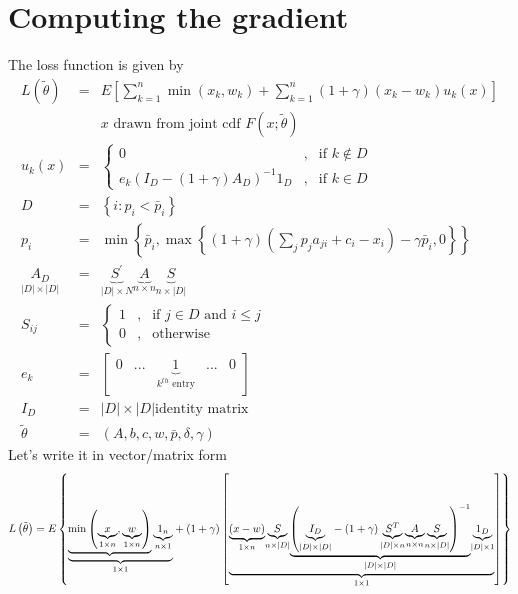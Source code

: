 \documentclass{article}
\begin{document}
\section{Computing the gradient}

The loss function is given by 
\begin{eqnarray*}
L\left( \tilde{\theta}\right)  &=&E\left[ \sum_{k=1}^{n}\min \left(
x_{k},w_{k}\right) +\sum_{k=1}^{n}\left( 1+\gamma \right) \left(
x_{k}-w_{k}\right) u_{k}\left( x\right) \right]  \\
&&x\text{ drawn from joint cdf }F\left( x;\tilde{\theta}\right)  \\
u_{k}\left( x\right)  &=&\left\{ 
\begin{array}{ccc}
0 & , & \text{if }k\notin D \\ 
e_{k}\left( I_{D}-\left( 1+\gamma \right) A_{D}\right) ^{-1}1_{D} & , & 
\text{if }k\in D%
\end{array}%
\right.  \\
D &=&\left\{ i:p_{i}<\bar{p}_{i}\right\}  \\
p_{i} &=&\min \left\{ \bar{p}_{i},\max \left\{ \left( 1+\gamma \right)
\left( \sum_{j}p_{j}a_{ji}+c_{i}-x_{i}\right) -\gamma \bar{p}_{i},0\right\}
\right\}  \\
\underset{\left\vert D\right\vert \times \left\vert D\right\vert }{A_{D}} &=&%
\underset{\left\vert D\right\vert \times N}{\underbrace{S^{\prime }}}%
\underset{n\times n}{\underbrace{A}}\underset{n\times \left\vert
D\right\vert }{\underbrace{S}} \\
S_{ij} &=&\left\{ 
\begin{array}{ccc}
1 & , & \text{if }j\in D\text{ and }i\leq j \\ 
0 & , & \text{otherwise}%
\end{array}%
\right.  \\
e_{k} &=&\left[ 
\begin{array}{ccccc}
0 & ... & \underset{k^{th}\text{ entry}}{\underbrace{1}} & ... & 0%
\end{array}%
\right]  \\
I_{D} &=&\left\vert D\right\vert \times \left\vert D\right\vert \text{
identity matrix} \\
\tilde{\theta} &=&\left( A,b,c,w,\bar{p},\delta ,\gamma \right) 
\end{eqnarray*}%
Let's write it in vector/matrix form%
\[
L\left( \tilde{\theta}\right) =E\left\{ \underset{1\times 1}{\underbrace{%
\underbrace{\min \left( \underset{1\times n}{\underbrace{x}},\underset{%
1\times n}{\underbrace{w}}\right) }\underset{n\times 1}{\underbrace{1_{n}}}}}%
+\left( 1+\gamma \right) \left[ \underset{1\times 1}{\underbrace{\underset{%
1\times n}{\underbrace{\left( x-w\right) }}\underset{n\times \left\vert
D\right\vert }{\underbrace{S}}\underset{\left\vert D\right\vert \times
\left\vert D\right\vert }{\underbrace{\left( \underset{\left\vert
D\right\vert \times \left\vert D\right\vert }{\underbrace{I_{D}}}-\left(
1+\gamma \right) \underset{\left\vert D\right\vert \times n}{\underbrace{%
S^{T}}}\underset{n\times n}{\underbrace{A}}\underset{n\times \left\vert
D\right\vert }{\underbrace{S}}\right) ^{-1}}}\underset{\left\vert
D\right\vert \times 1}{\underbrace{1_{D}}}}}\right] \right\} 
\]%
\end{document}
